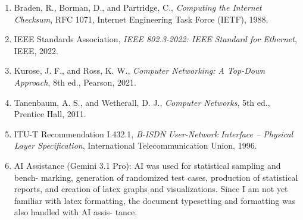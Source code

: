 \documentclass[11pt,a4paper]{article}
\begin{document}
\begin{enumerate}
    \item Braden, R., Borman, D., and Partridge, C., \textit{Computing the Internet Checksum}, RFC 1071, Internet Engineering Task Force (IETF), 1988.
    \item IEEE Standards Association, \textit{IEEE 802.3-2022: IEEE Standard for Ethernet}, IEEE, 2022.
    \item Kurose, J. F., and Ross, K. W., \textit{Computer Networking: A Top-Down Approach}, 8th ed., Pearson, 2021.
    \item Tanenbaum, A. S., and Wetherall, D. J., \textit{Computer Networks}, 5th ed., Prentice Hall, 2011.
    \item ITU-T Recommendation I.432.1, \textit{B-ISDN User-Network Interface -- Physical Layer Specification}, International Telecommunication Union, 1996.
    \item AI Assistance (Gemini 3.1 Pro): AI was used for statistical sampling and bench-
marking, generation of randomized test cases, production of statistical reports, and
creation of latex graphs and visualizations. Since I am not yet familiar with latex
formatting, the document typesetting and formatting was also handled with AI assis-
tance.
\end{enumerate}
\end{document}
